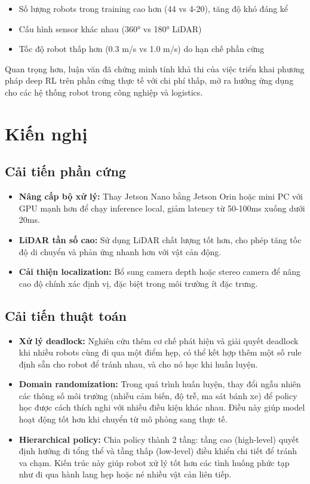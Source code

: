 \begin{itemize}[nosep]
\item Số lượng robots trong training cao hơn (44 vs 4-20), tăng độ khó đáng kể
\item Cấu hình sensor khác nhau (360° vs 180° LiDAR)
\item Tốc độ robot thấp hơn (0.3 m/s vs 1.0 m/s) do hạn chế phần cứng
\end{itemize}

Quan trọng hơn, luận văn đã chứng minh tính khả thi của việc triển khai phương pháp deep RL trên phần cứng thực tế với chi phí thấp, mở ra hướng ứng dụng cho các hệ thống robot trong công nghiệp và logistics.

\section{Kiến nghị}
\label{sec:recommendations}

\subsection{Cải tiến phần cứng}

\begin{itemize}[nosep]
\item \textbf{Nâng cấp bộ xử lý:} Thay Jetson Nano bằng Jetson Orin hoặc mini PC với GPU mạnh hơn để chạy inference local, giảm latency từ 50-100ms xuống dưới 20ms.
\item \textbf{LiDAR tần số cao:} Sử dụng LiDAR chất lượng tốt hơn, cho phép tăng tốc độ di chuyển và phản ứng nhanh hơn với vật cản động.
\item \textbf{Cải thiện localization:} Bổ sung camera depth hoặc stereo camera để nâng cao độ chính xác định vị, đặc biệt trong môi trường ít đặc trưng.
\end{itemize}

\subsection{Cải tiến thuật toán}

\begin{itemize}[nosep]
\item \textbf{Xử lý deadlock:} Nghiên cứu thêm cơ chế phát hiện và giải quyết deadlock khi nhiều robots cùng đi qua một điểm hẹp, có thể kết hợp thêm một số rule định sẵn cho robot để tránh nhau, và cho nó học khi huấn luyện.
\item \textbf{Domain randomization:} Trong quá trình huấn luyện, thay đổi ngẫu nhiên các thông số môi trường (nhiễu cảm biến, độ trễ, ma sát bánh xe) để policy học được cách thích nghi với nhiều điều kiện khác nhau. Điều này giúp model hoạt động tốt hơn khi chuyển từ mô phỏng sang thực tế.
\item \textbf{Hierarchical policy:} Chia policy thành 2 tầng: tầng cao (high-level) quyết định hướng đi tổng thể và tầng thấp (low-level) điều khiển chi tiết để tránh va chạm. Kiến trúc này giúp robot xử lý tốt hơn các tình huống phức tạp như đi qua hành lang hẹp hoặc né nhiều vật cản liên tiếp.
\end{itemize}

